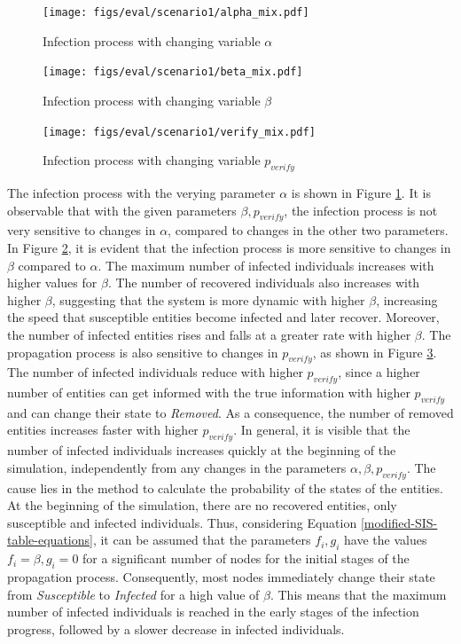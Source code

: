 \begin{figure}[!ht]
    \centering
    \texttt{[image: figs/eval/scenario1/alpha\_mix.pdf]}
    \caption{Infection process with changing variable $\alpha$}
    \label{scen1variablealpha} 
\end{figure}

\begin{figure}[!ht]
    \centering
    \texttt{[image: figs/eval/scenario1/beta\_mix.pdf]}
    \caption{Infection process with changing variable $\beta$}
    \label{scen1variablebeta} 
\end{figure}

\begin{figure}[!ht]
    \centering
    \texttt{[image: figs/eval/scenario1/verify\_mix.pdf]}
    \caption{Infection process with changing variable $p_{verify}$}
    \label{scen1variablepverify} 
\end{figure}

The infection process with
the verying parameter $\alpha$ is shown in Figure \ref{scen1variablealpha}. 
It is observable that with the given
parameters $\beta, p_{verify}$, the infection process is
not very sensitive to changes in $\alpha$, compared to changes 
in the other two parameters.
In Figure \ref{scen1variablebeta}, it is evident that the
infection process is more sensitive to changes in 
$\beta$ compared to $\alpha$. The maximum number of infected 
individuals increases with higher values for $\beta$.
The number of recovered individuals also increases with higher
$\beta$, suggesting that the system is more dynamic with higher 
$\beta$, increasing the speed that susceptible entities
become infected and later recover. Moreover,
the number of infected entities rises and falls at a greater rate with 
higher $\beta$. The propagation process is also 
sensitive to changes in $p_{verify}$, as shown in Figure \ref{scen1variablepverify}. 
The number of infected 
individuals reduce with higher $p_{verify}$, since a higher
number of entities can get informed with the true information
with higher $p_{verify}$ and can change their state to 
\textit{Removed}. As a consequence, the number of removed
entities increases faster with higher $p_{verify}$.
In general, it is visible that the number of infected
individuals increases quickly at the beginning of 
the simulation, independently from any
changes in the parameters $\alpha, \beta, p_{verify}$. 
The cause lies in the method to 
calculate the probability of the states of the entities.
At the beginning of the simulation, there are no recovered
entities, only susceptible and infected individuals.
Thus, considering Equation 
\ref{modified-SIS-table-equations}, it can be assumed
that the parameters $f_i, g_i$ have the values 
$f_i=\beta, g_i=0$ for a significant number of nodes
for the initial stages of the propagation process. 
Consequently, most nodes immediately 
change their state from \textit{Susceptible} 
to \textit{Infected} for a high value of $\beta$.
This means that the maximum number of infected 
individuals is reached in the early stages of the 
infection progress, followed by a slower decrease
in infected individuals. 

